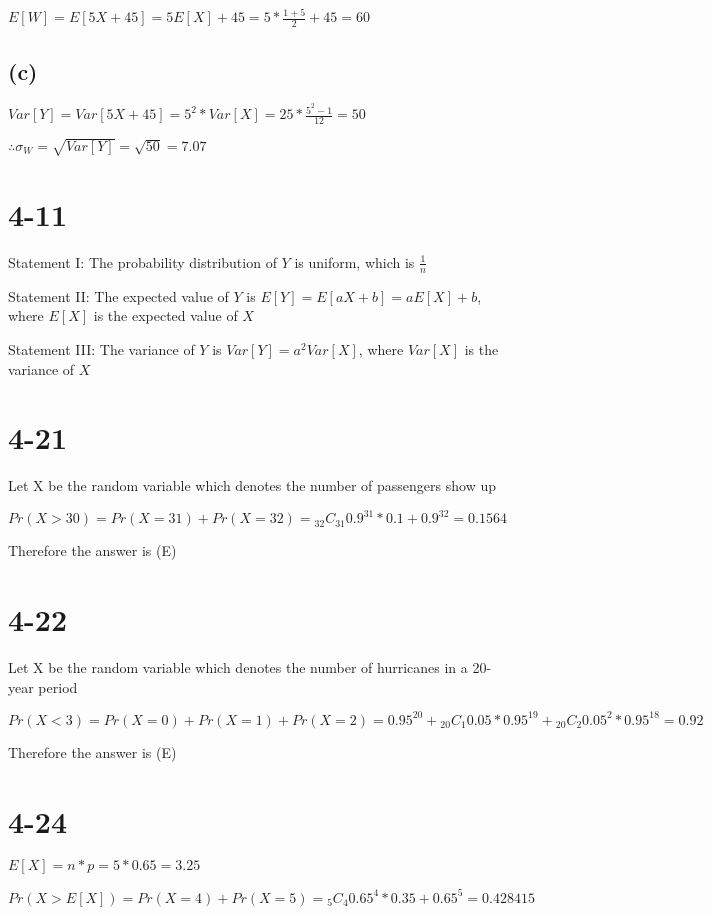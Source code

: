\documentclass[12pt]{article}
\begin{document}
\begin{spacing}{2.0}
$E[W]=E[5X+45]= 5E[X]+45= 5*\frac{1+5}{2} +45 = 60$

\subsection*{(c)}

$Var[Y]=Var[5X+45]= 5^2*Var[X]= 25*\frac{5^2-1}{12}= 50$

$\therefore \sigma_W=\sqrt{Var[Y]}= \sqrt{50}= 7.07$

\section*{4-11}

Statement I: The probability distribution of $Y$ is uniform, which is $\frac{1}{n}$

Statement II: The expected value of $Y$ is $E[Y]=E[aX+b]= aE[X]+b$, where $E[X]$ is the expected value of $X$

Statement III: The variance of $Y$ is $Var[Y]= a^2Var[X]$, where $Var[X]$ is the variance of $X$

\section*{4-21}

Let X be the random variable which denotes the number of passengers show up

$Pr(X>30) = Pr(X=31)+Pr(X=32)= {}_{32}C_{31} 0.9^31*0.1 + 0.9^32= 0.1564$

Therefore the answer is (E)

\section*{4-22}

Let X be the random variable which denotes the number of hurricanes in a 20-year period

$Pr(X<3)= Pr(X=0)+ Pr(X=1) + Pr(X=2)= 0.95^{20}+ {}_{20}C_{1} 0.05*0.95^{19} + {}_{20}C_{2} 0.05^2*0.95^{18}= 0.92$

Therefore the answer is (E)

\section*{4-24}

$E[X]= n*p= 5*0.65= 3.25$

$Pr(X>E[X])= Pr(X=4)+ Pr(X=5)= {}_{5}C_{4} 0.65^4* 0.35+ 0.65^5= 0.428415$

\end{spacing}
\end{document}
